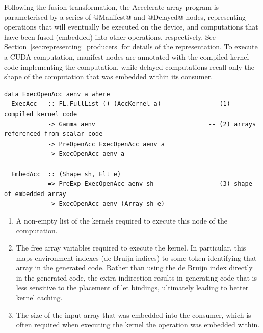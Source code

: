 Following the fusion transformation, the Accelerate array program is
parameterised by a series of @Manifest@ and @Delayed@ nodes,
representing operations that will eventually be executed on the device, and
computations that have been fused (embedded) into other operations,
respectively. See Section~\ref{sec:representing_producers} for details of the
representation. To execute a CUDA computation, manifest nodes are annotated with
the compiled kernel code implementing the computation, while delayed
computations recall only the shape of the computation that was embedded within
its consumer.
%
\begin{lstlisting}[style=haskell]
data ExecOpenAcc aenv a where
  ExecAcc   :: FL.FullList () (AccKernel a)             -- (1) compiled kernel code
            -> Gamma aenv                               -- (2) arrays referenced from scalar code
            -> PreOpenAcc ExecOpenAcc aenv a
            -> ExecOpenAcc aenv a

  EmbedAcc  :: (Shape sh, Elt e)
            => PreExp ExecOpenAcc aenv sh               -- (3) shape of embedded array
            -> ExecOpenAcc aenv (Array sh e)
\end{lstlisting}
%
\begin{enumerate}
\item A non-empty list of the kernels required to execute this node of the
    computation.

\item The free array variables required to execute the kernel. In particular,
    this maps environment indexes (de Bruijn indices) to some token identifying
    that array in the generated code. Rather than using the de Bruijn index
    directly in the generated code, the extra indirection results in generating
    code that is less sensitive to the placement of let bindings, ultimately
    leading to better kernel caching.

\item The size of the input array that was embedded into the consumer, which is
    often required when executing the kernel the operation was embedded within.
\end{enumerate}

